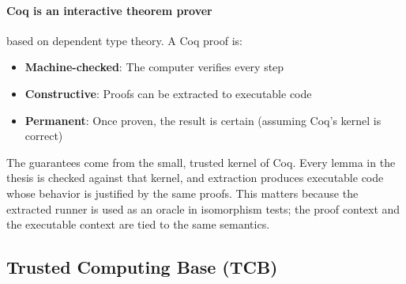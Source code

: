 \paragraph{Coq is an interactive theorem prover} based on dependent type theory. A Coq proof is:
\begin{itemize}
    \item \textbf{Machine-checked}: The computer verifies every step
    \item \textbf{Constructive}: Proofs can be extracted to executable code
    \item \textbf{Permanent}: Once proven, the result is certain (assuming Coq's kernel is correct)
\end{itemize}
The guarantees come from the small, trusted kernel of Coq. Every lemma in the thesis is checked against that kernel, and extraction produces executable code whose behavior is justified by the same proofs. This matters because the extracted runner is used as an oracle in isomorphism tests; the proof context and the executable context are tied to the same semantics.

\subsection{Trusted Computing Base (TCB)}

